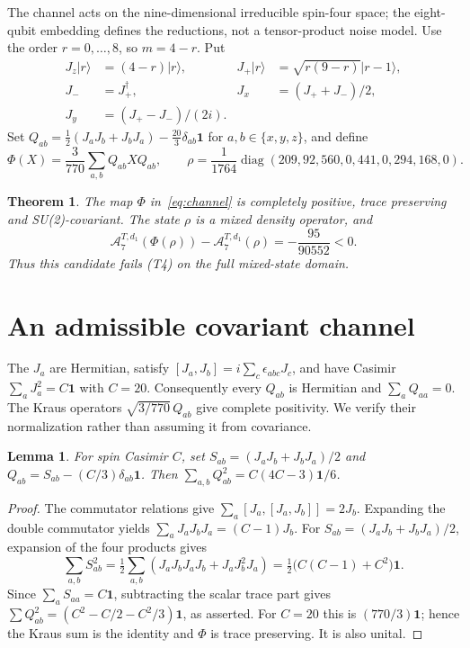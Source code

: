 \documentclass[11pt]{article}
\newcommand{\id}{\mathbf{1}}
\newcommand{\A}{\mathcal{A}}
\newtheorem{theorem}{Theorem}
\newtheorem{lemma}{Lemma}
\begin{document}
The channel acts on the nine-dimensional irreducible spin-four space;
the eight-qubit embedding defines the reductions, not a tensor-product
noise model. Use the order $r=0,\ldots,8$, so $m=4-r$. Put
\begin{align}
 J_z|r\rangle&=(4-r)|r\rangle,&
 J_+|r\rangle&=\sqrt{r(9-r)}|r-1\rangle,\nonumber\\
 J_-&=J_+^\dagger,& J_x&=(J_++J_-)/2,\nonumber\\
 J_y&=(J_+-J_-)/(2i).&&\label{eq:spin}
\end{align}
Set $Q_{ab}=\frac12(J_aJ_b+J_bJ_a)-\frac{20}{3}\delta_{ab}\id$
for $a,b\in\{x,y,z\}$, and define
\begin{equation}\label{eq:channel}
 \Phi(X)=\frac3{770}\sum_{a,b}Q_{ab}XQ_{ab},\qquad
 \rho=\frac1{1764}\operatorname{diag}(209,92,560,0,441,0,294,168,0).
\end{equation}

\begin{theorem}\label{thm:main}
The map $\Phi$ in~\eqref{eq:channel} is completely positive, trace preserving
and SU(2)-covariant. The state $\rho$ is a mixed density operator, and
\[
 \A_7^{T,d_1}(\Phi(\rho))-\A_7^{T,d_1}(\rho)
 =-\frac{95}{90552}<0.
\]
Thus this candidate fails (T4) on the full mixed-state domain.
\end{theorem}

\section{An admissible covariant channel}
The $J_a$ are Hermitian, satisfy $[J_a,J_b]=i\sum_c\epsilon_{abc}J_c$,
and have Casimir $\sum_aJ_a^2=C\id$ with $C=20$.
Consequently every $Q_{ab}$ is Hermitian and $\sum_a Q_{aa}=0$.
The Kraus operators $\sqrt{3/770}\,Q_{ab}$ give complete positivity.
We verify their normalization rather than assuming it from covariance.

\begin{lemma}\label{lem:normalization}
For spin Casimir $C$, set $S_{ab}=(J_aJ_b+J_bJ_a)/2$ and
$Q_{ab}=S_{ab}-(C/3)\delta_{ab}\id$. Then
$\sum_{a,b}Q_{ab}^2=C(4C-3)\id/6$.
\end{lemma}
\begin{proof}
The commutator relations give
$\sum_a[J_a,[J_a,J_b]]=2J_b$. Expanding the double commutator yields
$\sum_aJ_aJ_bJ_a=(C-1)J_b$.
For $S_{ab}=(J_aJ_b+J_bJ_a)/2$, expansion of the four products gives
\[
 \sum_{a,b}S_{ab}^2
 =\tfrac12\sum_{a,b}(J_aJ_bJ_aJ_b+J_aJ_b^2J_a)
 =\tfrac12\bigl(C(C-1)+C^2\bigr)\id.
\]
Since $\sum_aS_{aa}=C\id$, subtracting the scalar trace part gives
$\sum Q_{ab}^2=(C^2-C/2-C^2/3)\id$, as asserted.
For $C=20$ this is $(770/3)\id$; hence the Kraus sum is the identity
and $\Phi$ is trace preserving. It is also unital.
\end{proof}
\end{document}
